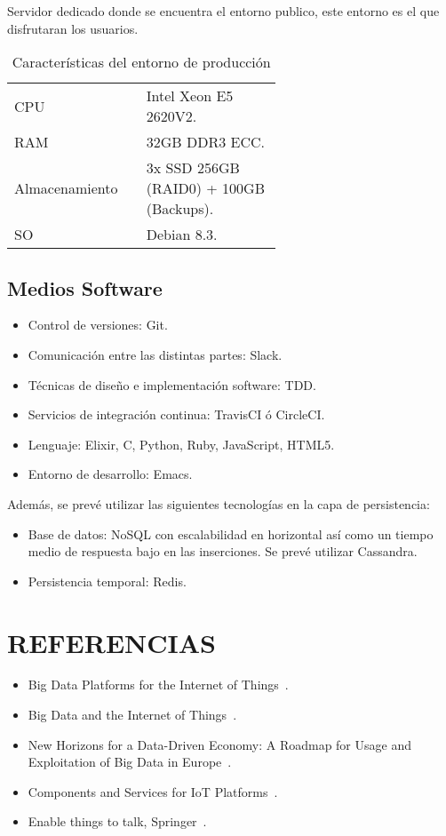 \documentclass{pre-tfg}
\begin{document}
Servidor dedicado donde se encuentra el entorno publico, este entorno es el que
disfrutaran los usuarios.

\begin{table}[hp]
  \caption{Características del entorno de producción}
  \centering

  \begin{tabular}{p{0.2\linewidth}p{0.4\linewidth}}
    CPU& Intel Xeon E5 2620V2.\\
    RAM& 32GB DDR3 ECC.\\
    Almacenamiento& 3x SSD 256GB (RAID0) + 100GB (Backups).\\
    SO& Debian 8.3.\\
  \end{tabular}
\end{table}

\clearpage
\subsection{Medios Software}

\begin{itemize}
\item Control de versiones: Git.
\item Comunicación entre las distintas partes: Slack.
\item Técnicas de diseño e implementación software: TDD.
\item Servicios de integración continua: TravisCI ó CircleCI.
\item Lenguaje: Elixir, C, Python, Ruby, JavaScript, HTML5.
\item Entorno de desarrollo: Emacs.
\end{itemize}

Además, se prevé utilizar las siguientes tecnologías en la capa de persistencia:
%
\begin{itemize}
\item Base de datos: NoSQL con escalabilidad en horizontal así como un
  tiempo medio de respuesta bajo en las inserciones. Se prevé utilizar Cassandra.
\item Persistencia temporal: Redis.
\end{itemize}


\section{REFERENCIAS}


\begin{itemize}
  \item Big Data Platforms for the Internet of Things~\cite{Ciobanu2014}.
  \item Big Data and the Internet of Things~\cite{Shah2016}.
  \item New Horizons for a Data-Driven Economy: A Roadmap for Usage and Exploitation of Big Data in Europe~\cite{Strohbach2016}.
  \item Components and Services for IoT Platforms~\cite{CaSfIotPlatforms17}.
  \item Enable things to talk, Springer~\cite{EIoT2Talk13}.
\end{itemize}



\end{document}
